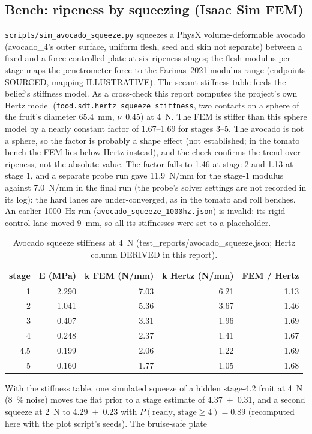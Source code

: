 \documentclass[10.5pt,a4paper]{article}
\begin{document}
\subsection{Bench: ripeness by squeezing (Isaac Sim FEM)}
\texttt{scripts/sim\_avocado\_squeeze.py} squeezes a PhysX volume-deformable avocado (avocado\_4's outer surface,
uniform flesh, seed and skin not separate) between a fixed and a force-controlled plate at six ripeness stages; the
flesh modulus per stage maps the penetrometer force to the Farinas~2021 modulus range (endpoints SOURCED, mapping
ILLUSTRATIVE). The secant stiffness table feeds the belief's stiffness model. As a cross-check this report computes
the project's own Hertz model (\texttt{food.sdt.hertz\_squeeze\_stiffness}, two contacts on a sphere of the fruit's
diameter 65.4~mm, $\nu$~0.45) at 4~N. The FEM is stiffer than this sphere model by a nearly constant factor of 1.67--1.69 for stages 3--5. The avocado is not a sphere, so the factor is probably a shape effect (not established; in the tomato bench the FEM lies below Hertz instead), and the check confirms the trend over ripeness, not the absolute value. The factor falls to 1.46 at stage 2 and 1.13 at stage 1, and a separate probe run gave 11.9~N/mm for the stage-1 modulus against 7.0~N/mm in the final run (the probe's solver settings are not recorded in its log): the hard lanes are under-converged, as in the tomato and roll benches. An earlier 1000~Hz run (\texttt{avocado\_squeeze\_1000hz.json})
is invalid: its rigid control lane moved 9~mm, so all its stiffnesses were set to a placeholder.
\begin{table}[htbp]\centering\scriptsize\caption{Avocado squeeze stiffness at 4~N (test\_reports/avocado\_squeeze.json; Hertz column DERIVED in this report).}
\begin{tabularx}{\linewidth}{@{}rrrrr@{}}\toprule stage & E (MPa) & k FEM (N/mm) & k Hertz (N/mm) & FEM / Hertz \\\midrule
1 & 2.290 & 7.03 & 6.21 & 1.13 \\
2 & 1.041 & 5.36 & 3.67 & 1.46 \\
3 & 0.407 & 3.31 & 1.96 & 1.69 \\
4 & 0.248 & 2.37 & 1.41 & 1.67 \\
4.5 & 0.199 & 2.06 & 1.22 & 1.69 \\
5 & 0.160 & 1.77 & 1.05 & 1.68 \\\bottomrule\end{tabularx}\end{table}
With the stiffness table, one simulated squeeze of a hidden stage-4.2 fruit at 4~N (8~\% noise) moves the flat prior to a stage estimate of 4.37~$\pm$~0.31, and a second squeeze at 2~N to 4.29~$\pm$~0.23 with $P(\text{ready, stage} \ge 4) = 0.89$ (recomputed here with the plot script's seeds). The bruise-safe plate
\end{document}
